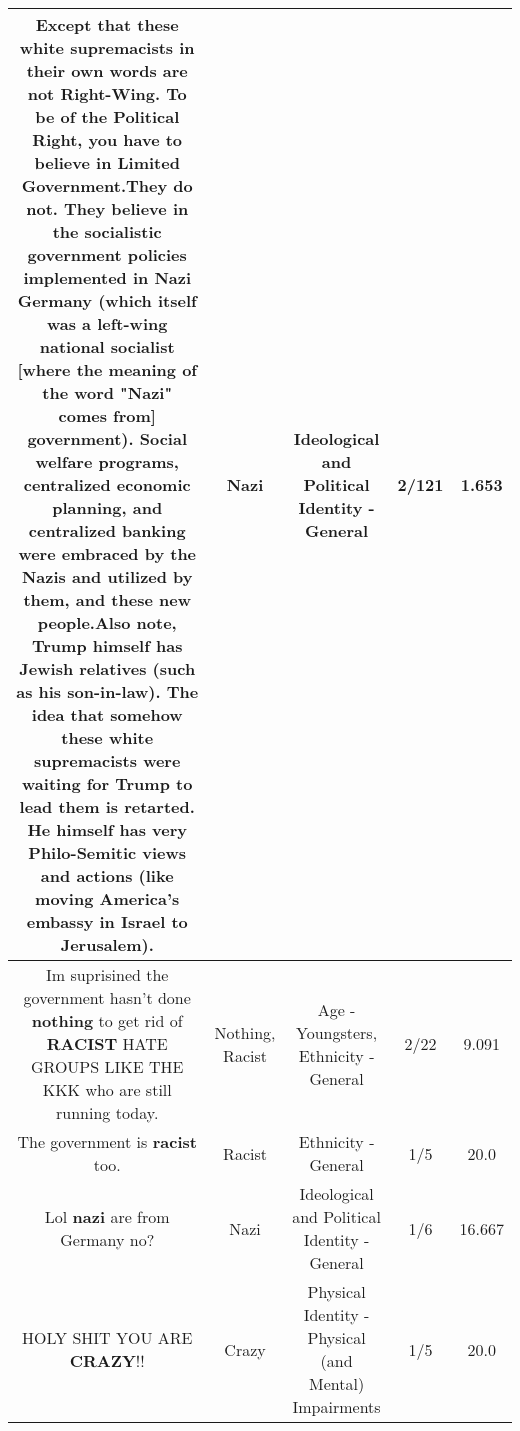 \documentclass[11pt]{article}
\newlength\mylength
\begin{document}
\begin{center}
\begin{longtable}{|C{.65\mylength}|C{.30\mylength}|C{.12\mylength}|C{.12\mylength}|C{.12\mylength}|}
  \small Except that these white supremacists in their own words are not Right-Wing. To be of the Political Right, you have to believe in Limited Government.They do not. They believe in the socialistic government policies implemented in \textbf{Nazi} Germany (which itself was a left-wing national socialist [where the meaning of the word "\textbf{Nazi}" comes from] government). Social welfare programs, centralized economic planning, and centralized banking were embraced by the Nazis and utilized by them, and these new people.Also note, Trump himself has Jewish relatives (such as his son-in-law). The idea that somehow these white supremacists were waiting for Trump to lead them is retarted. He himself has very Philo-Semitic views and actions (like moving America's embassy in Israel to Jerusalem).\normalsize   & Nazi &  Ideological and Political Identity - General & 2/121 & 1.653 \\  \hline
  \small Im suprisined the government hasn't done \textbf{nothing} to get rid of \textbf{RACIST} HATE GROUPS LIKE THE KKK who are still running today.\normalsize   & Nothing, Racist & Age - Youngsters, Ethnicity - General & 2/22 & 9.091 \\  \hline
  \small The government is \textbf{racist} too.\normalsize   & Racist & Ethnicity - General & 1/5 & 20.0 \\  \hline
  \small Lol \textbf{nazi} are from Germany no?\normalsize   & Nazi &  Ideological and Political Identity - General & 1/6 & 16.667 \\  \hline
  \small HOLY SHIT YOU ARE \textbf{CRAZY}!!\normalsize   & Crazy & Physical Identity - Physical (and Mental) Impairments & 1/5 & 20.0 \\  \hline

\end{longtable}
\end{center}
\end{document}
